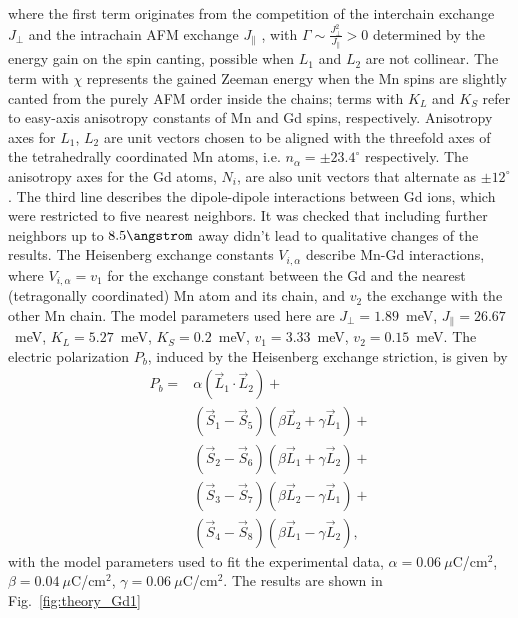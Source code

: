 where the first term originates from the competition of the interchain exchange $J_\perp$ and the intrachain AFM exchange $J_\|$ \cite{Sushkov2008}, with $\Gamma\sim\frac{J_{\perp}^2}{J_\|}>0$ determined by the energy gain on the spin canting, possible when $L_1$ and $L_2$ are not collinear. The term with $\chi$ represents the gained Zeeman energy when the Mn spins are slightly canted from the purely AFM order inside the chains; terms with $K_L$ and $K_S$ refer to easy-axis anisotropy constants of Mn and Gd spins, respectively.
Anisotropy axes for $L_1$, $L_2$ are unit vectors chosen to be aligned with the threefold axes of the tetrahedrally coordinated Mn atoms, i.e. $n_\alpha=\pm23.4^\circ$ respectively. The anisotropy axes for the Gd atoms, $N_i$, are also unit vectors that alternate as $\pm 12^\circ$. The third line describes the dipole-dipole interactions between Gd ions, which were restricted to five nearest neighbors. It was checked that including further neighbors up to $8.5\angstrom$ away didn't lead to qualitative changes of the results. The Heisenberg exchange constants $V_{i,\alpha}$ describe Mn-Gd interactions, where $V_{i,\alpha}=v_1$ for the exchange constant between the Gd and the nearest (tetragonally coordinated) Mn atom and its chain, and $v_2$ the exchange with the other Mn chain. The model parameters used here are $J_\perp = 1.89$~meV, $J_\parallel = 26.67$~meV, $K_L = 5.27$~meV, $K_S = 0.2$~meV, $v_1 = 3.33$~meV, $v_2 = 0.15$~meV. The electric polarization $P_b$, induced by the Heisenberg exchange striction, is given by
\begin{align}
    P_b=&\alpha (\vec{L}_1\cdot \vec{L}_2)+\nonumber\\
    &(\vec{S}_1-\vec{S}_5)(\beta \vec{L}_2 + \gamma \vec{L}_1) +\nonumber\\
    &(\vec{S}_2-\vec{S}_6)(\beta \vec{L}_1 + \gamma \vec{L}_2) +\\ 
    &(\vec{S}_3-\vec{S}_7)(\beta \vec{L}_2 - \gamma \vec{L}_1) +\nonumber\\ 
    &(\vec{S}_4-\vec{S}_8)(\beta \vec{L}_1 - \gamma \vec{L}_2)\nonumber,
\end{align}
with the model parameters used to fit the experimental data, $\alpha = 0.06\:\mu$C/cm$^2$, $\beta = 0.04\:\mu$C/cm$^2$, $\gamma = 0.06\:\mu$C/cm$^2$. The results are shown in Fig.~\ref{fig:theory_Gd1}

